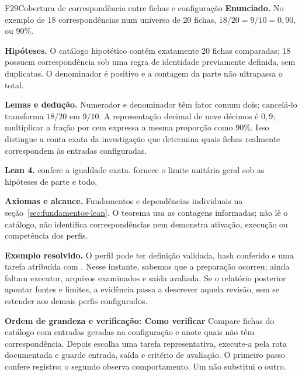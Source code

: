 \begin{formalizacao}{F29}{Cobertura de correspondência entre fichas e configuração}
\textbf{Enunciado.} No exemplo de 18 correspondências num universo de
20 fichas, $18/20=9/10=0{,}90$, ou $90\%$.

\textbf{Hipóteses.} O catálogo hipotético contém exatamente 20 fichas
comparadas; 18 possuem correspondência sob uma regra de identidade
previamente definida, sem duplicatas. O denominador é positivo e a
contagem da parte não ultrapassa o total.

\textbf{Lemas e dedução.} Numerador e denominador têm fator comum dois;
cancelá-lo transforma $18/20$ em $9/10$. A representação decimal de
nove décimos é $0{,}9$; multiplicar a fração por cem expressa a mesma
proporção como $90\%$. Isso distingue a conta exata da investigação que
determina quais fichas realmente correspondem às entradas configuradas.

\textbf{Lean 4.} 
confere a igualdade exata. 
fornece o limite unitário geral sob as hipóteses de parte e todo.

\textbf{Axiomas e alcance.} Fundamentos e dependências individuais na
seção~\ref{sec:fundamentos-lean}. O teorema usa as contagens informadas;
não lê o catálogo, não identifica correspondências nem demonstra
ativação, execução ou competência dos perfis.
\end{formalizacao}

\begin{resultado}
\textbf{Exemplo resolvido.} O perfil  pode ter definição
validada, hash conferido e uma tarefa atribuída com .
Nesse instante, sabemos que a preparação ocorreu; ainda faltam executor,
arquivos examinados e saída avaliada. Se o relatório posterior apontar fontes e
limites, a evidência passa a descrever aquela revisão, sem se estender aos
demais \CoreAgentCount{} perfis configurados.
\end{resultado}

\begin{resultado}
\textbf{Ordem de grandeza e verificação: Como verificar} Compare fichas do catálogo com entradas geradas na
configuração e anote quais não têm correspondência. Depois escolha uma tarefa
representativa, execute-a pela rota documentada e guarde entrada, saída e
critério de avaliação. O primeiro passo confere registro; o segundo observa
comportamento. Um não substitui o outro.
\end{resultado}

